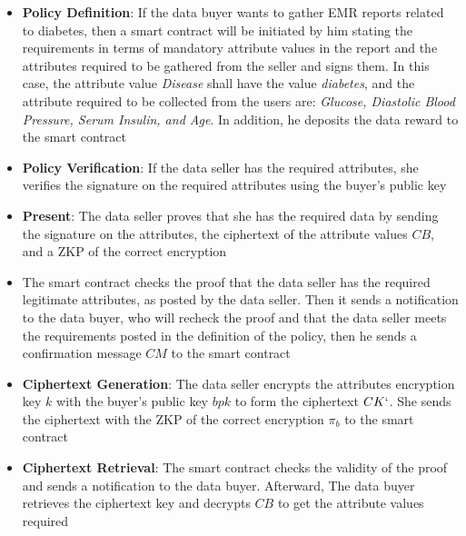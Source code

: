 \begin{itemize}
    \item \textbf{Policy Definition}: If the data buyer wants to gather EMR reports related to diabetes, then a smart contract will be initiated by him stating the requirements in terms of mandatory attribute values in the report and the attributes required to be gathered from the seller and signs them. 
    In this case, the attribute value \textit{Disease} shall have the value \textit{diabetes}, and the attribute required to be collected from the users are: \textit{Glucose, Diastolic Blood Pressure, Serum Insulin, and Age}. 
    In addition, he deposits the data reward to the smart contract
    \item \textbf{Policy Verification}: If the data seller has the required attributes, she verifies the signature on the required attributes using the buyer's public key
    \item \textbf{Present}: The data seller proves that she has the required data by sending the signature on the attributes, the ciphertext of the attribute values $CB$, and a ZKP of the correct encryption
    \item The smart contract checks the proof that the data seller has the required legitimate attributes, as posted by the data seller. 
    Then it sends a notification to the data buyer, who will recheck the proof and that the data seller meets the requirements posted in the definition of the policy, then he sends a confirmation message $CM$ to the smart contract
    \item \textbf{Ciphertext Generation}: The data seller encrypts the attributes encryption key $k$ with the buyer's public key $bpk$ to form the ciphertext $CK`$. 
    She sends the ciphertext with the ZKP of the correct encryption $\pi_b$ to the smart contract
    \item \textbf{Ciphertext Retrieval}: The smart contract checks the validity of the proof and sends a notification to the data buyer. 
    Afterward, The data buyer retrieves the ciphertext key and decrypts $CB$ to get the attribute values required
\end{itemize}


